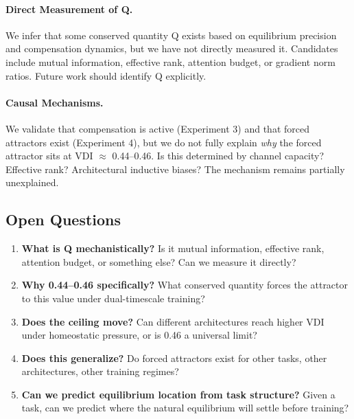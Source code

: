 \paragraph{Direct Measurement of Q.}
We infer that some conserved quantity Q exists based on equilibrium precision and compensation dynamics, but we have not directly measured it. Candidates include mutual information, effective rank, attention budget, or gradient norm ratios. Future work should identify Q explicitly.

\paragraph{Causal Mechanisms.}
We validate that compensation is active (Experiment 3) and that forced attractors exist (Experiment 4), but we do not fully explain \emph{why} the forced attractor sits at VDI $\approx$ 0.44--0.46. Is this determined by channel capacity? Effective rank? Architectural inductive biases? The mechanism remains partially unexplained.

\subsection{Open Questions}

\begin{enumerate}
\item \textbf{What is Q mechanistically?} Is it mutual information, effective rank, attention budget, or something else? Can we measure it directly?

\item \textbf{Why 0.44--0.46 specifically?} What conserved quantity forces the attractor to this value under dual-timescale training?

\item \textbf{Does the ceiling move?} Can different architectures reach higher VDI under homeostatic pressure, or is 0.46 a universal limit?

\item \textbf{Does this generalize?} Do forced attractors exist for other tasks, other architectures, other training regimes?

\item \textbf{Can we predict equilibrium location from task structure?} Given a task, can we predict where the natural equilibrium will settle before training?
\end{enumerate}
